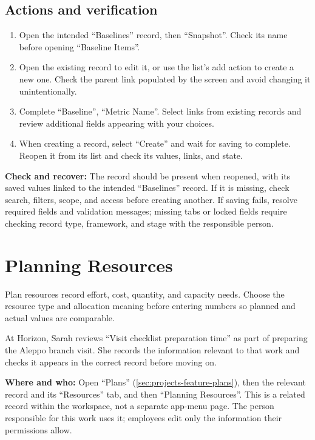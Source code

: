 \subsection{Actions and verification}
\begin{enumerate}
\item Open the intended “Baselines” record, then “Snapshot”. Check its name before opening “Baseline Items”.
\item Open the existing record to edit it, or use the list's add action to create a new one. Check the parent link populated by the screen and avoid changing it unintentionally.
\item Complete “Baseline”, “Metric Name”. Select links from existing records and review additional fields appearing with your choices.
\item When creating a record, select “Create” and wait for saving to complete. Reopen it from its list and check its values, links, and state.
\end{enumerate}

\textbf{Check and recover:} The record should be present when reopened, with its saved values linked to the intended “Baselines” record. If it is missing, check search, filters, scope, and access before creating another. If saving fails, resolve required fields and validation messages; missing tabs or locked fields require checking record type, framework, and stage with the responsible person.

\clearpage
\section{Planning Resources}
\label{sec:projects-feature-planning-resources}

Plan resources record effort, cost, quantity, and capacity needs. Choose the resource type and allocation meaning before entering numbers so planned and actual values are comparable.

\begin{rcnote}
At Horizon, Sarah reviews “Visit checklist preparation time” as part of preparing the Aleppo branch visit. She records the information relevant to that work and checks it appears in the correct record before moving on.
\end{rcnote}

\textbf{Where and who:} Open “Plans” (\ref{sec:projects-feature-plans}), then the relevant record and its “Resources” tab, and then “Planning Resources”. This is a related record within the workspace, not a separate app-menu page. The person responsible for this work uses it; employees edit only the information their permissions allow.

